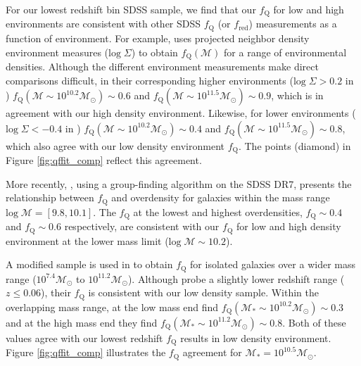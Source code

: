 For our lowest redshift bin SDSS sample, we find that our $f_{\mathrm{Q}}$
for low and high environments are consistent with other SDSS
$f_{\mathrm{Q}}$ (or $f_{\mathrm{red}}$) measurements as a function of
environment. For example, \cite{Baldry:2006aa} uses projected neighbor
density environment measures ($\mathrm{log} \; \Sigma$) to obtain
$f_{\mathrm{Q}}(\mathcal{M})$ for a range of environmental
densities. Although the different environment measurements make direct
comparisons difficult, in their corresponding higher environments
($\mathrm{log} \; \Sigma > 0.2$ in \citealt{Baldry:2006aa})
$f_{\mathrm{Q}}(\mathcal{M} \sim 10^{10.2} \mathcal{M}_{\odot}) \sim 0.6$
and $f_{\mathrm{Q}}(\mathcal{M} \sim 10^{11.5} \mathcal{M}_{\odot}) \sim
0.9$, which is in agreement with our high density
environment. Likewise, for lower environments ($\mathrm{log} \; \Sigma <
-0.4$ in \citealt{Baldry:2006aa}) $f_{\mathrm{Q}}(\mathcal{M} \sim
10^{10.2} \mathcal{M}_{\odot}) \sim 0.4$ and $f_{\mathrm{Q}}(\mathcal{M}
\sim 10^{11.5} \mathcal{M}_{\odot}) \sim 0.8$, which also agree with
our low density environment $f_{\mathrm{Q}}$. The \cite{Baldry:2006aa}
points (diamond) in Figure \ref{fig:qffit_comp} reflect this
agreement.

More recently, \cite{Tinker:2011aa}, using a group-finding algorithm on the SDSS DR7, presents the relationship between $f_{\mathrm{Q}}$ and overdensity for galaxies within the mass range $\mathrm{log} \; \mathcal{M} = [9.8, 10.1]$. The \cite{Tinker:2011aa} $f_{\mathrm{Q}}$ at the lowest and highest overdensities, $f_{\mathrm{Q}} \sim 0.4$ and $f_{\mathrm{Q}} \sim 0.6$ respectively, are consistent with our $f_{\mathrm{Q}}$ for low and high density environment at the lower mass limit ($\mathrm{log} \; \mathcal{M} \sim 10.2$). 

A modified \cite{Tinker:2011aa} sample is used in \cite{geha12a} to
obtain $f_{\mathrm{Q}}$ for isolated galaxies over a wider mass range
($10^{7.4} \mathcal{M}_\odot$ to $10^{11.2}
\mathcal{M}_{\odot}$). Although \cite{geha12a} probe a slightly lower
redshift range ($ z \le 0.06$), their $f_{\mathrm{Q}}$ is consistent with
our low density sample. Within the overlapping mass range, at the low
mass end \cite{geha12a} find $f_{\mathrm{Q}}(\mathcal{M}_{*} \sim
10^{10.2} \mathcal{M}_{\odot}) \sim 0.3$ and at the high mass end they
find $f_{\mathrm{Q}}(\mathcal{M}_{*} \sim 10^{11.2} \mathcal{M}_{\odot})
\sim 0.8$. Both of these values agree with our lowest redshift
$f_{\mathrm{Q}}$ results in low density environment. Figure
\ref{fig:qffit_comp} illustrates the $f_{\mathrm{Q}}$ agreement for
$\mathcal{M}_{*} = 10^{10.5} \mathcal{M}_{\odot}$.

